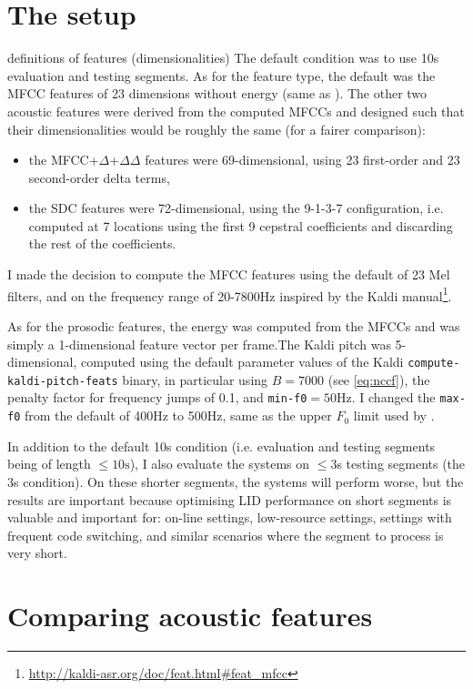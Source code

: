 \documentclass[bsc,frontabs,twoside,singlespacing,parskip,deptreport]{infthesis}
\begin{document}
{  \section{The setup}{
    \label{sec:exp-setup}
    definitions of features (dimensionalities)
    The default condition was to use 10s evaluation and testing segments. As for the feature type, the default was the MFCC features of 23 dimensions without energy (same as \citet{Snyder_et_al_2018}). The other two acoustic features were derived from the computed MFCCs and designed such that their dimensionalities would be roughly the same (for a fairer comparison):
    \begin{itemize}
      \item {the MFCC+$\Delta$+$\Delta\Delta$ features were 69-dimensional, using 23 first-order and 23 second-order delta terms,}
      \item {the SDC features were 72-dimensional, using the 9-1-3-7 configuration, i.e. computed at 7 locations using the first 9 cepstral coefficients and discarding the rest of the coefficients.}
    \end{itemize}
    I made the decision to compute the MFCC features using the default of 23 Mel filters, and on the frequency range of 20-7800Hz inspired by the Kaldi manual\footnote{\url{http://kaldi-asr.org/doc/feat.html\#feat_mfcc}}.

    As for the prosodic features, the energy was computed from the MFCCs and was simply a 1-dimensional feature vector per frame.The Kaldi pitch was 5-dimensional, computed using the default parameter values of the Kaldi \verb|compute-kaldi-pitch-feats| binary, in particular using $B=7000$ (see \autoref{eq:nccf}), the penalty factor for frequency jumps of 0.1, and \verb|min-f0|$=50$Hz. I changed the \verb|max-f0| from the default of 400Hz to 500Hz, same as the upper $F_0$ limit used by \citet{Lin_et_al_2005}.

    In addition to the default 10s condition (i.e. evaluation and testing segments being of length $\leq10\textrm{s}$), I also evaluate the systems on $\leq3$s testing segments (the 3s condition). On these shorter segments, the systems will perform worse, but the results are important because optimising LID performance on short segments is valuable and important for: on-line settings, low-resource settings, settings with frequent code switching, and similar scenarios where the segment to process is very short.
  }

  \section{Comparing acoustic features}{
    \label{sec:exp-acoustic}

}}
\end{document}
